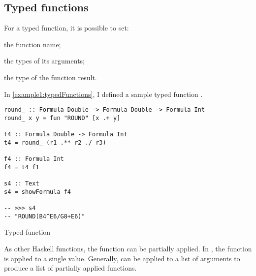 \subsection{Typed functions}

For a typed function, it is possible to set:
\begin{inlinelist}
  \item the function name;
  \item the types of its arguments;
  \item the type of the function result.
\end{inlinelist}

In \cref{example1:typedFunctions}, I defined a sample typed function .

\begin{listing}[!h]
  \begin{verbatim}
round_ :: Formula Double -> Formula Double -> Formula Int
round_ x y = fun "ROUND" [x .+ y]

t4 :: Formula Double -> Formula Int
t4 = round_ (r1 .** r2 ./ r3)

f4 :: Formula Int
f4 = t4 f1

s4 :: Text
s4 = showFormula f4

-- >>> s4
-- "ROUND(B4^E6/G8+E6)"
\end{verbatim}
  \caption{Typed function}
  \label{example1:typedFunctions}
\end{listing}

As other Haskell functions, the  function can be partially applied.
In , the  function is applied to a single value.
Generally,  can be applied to a list of arguments to produce a list of partially applied functions.
